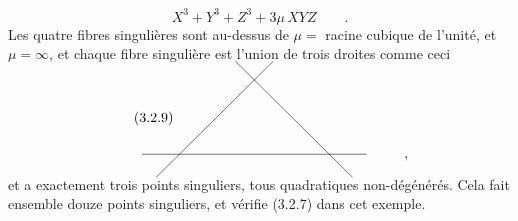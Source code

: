 \begin{equation}\tag{3.2.8}
X^3 + Y^3 + Z^3 + 3\mu\, XYZ \qquad .
\end{equation}
Les quatre fibres singulières sont au-dessus de $\mu =$ racine cubique de l'unité, et $\mu = \infty$, et chaque fibre singulière est l'union de trois droites comme ceci

\begin{equation}\tag{3.2.9}
\begin{tikzcd}[row sep=4.5em, column sep=4.5em]
	{} & {} \arrow[dl, dash, shorten <=-9mm, shorten >=-9mm] \arrow[dr, dash, shorten <=-9mm, shorten >=-9mm] & {} & {} \\
	{} \arrow[rr, dash, shorten <=-11mm, shorten >=-11mm] & {} & {} & {,}
\end{tikzcd}
\end{equation}
et a exactement trois points singuliers, tous quadratiques non-dégénérés. Cela fait ensemble douze points singuliers, et vérifie (3.2.7) dans cet exemple.



